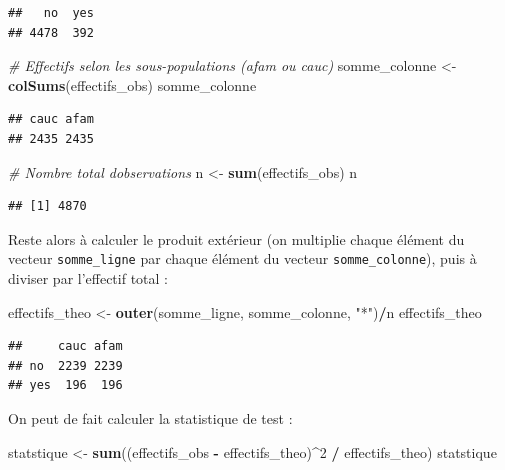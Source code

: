 \documentclass[
  11pt,
]{book}
\newenvironment{Shaded}{\begin{snugshade}}{\end{snugshade}}
\newcommand{\CommentTok}[1]{\textcolor[rgb]{0.56,0.35,0.01}{\textit{#1}}}
\newcommand{\DecValTok}[1]{\textcolor[rgb]{0.00,0.00,0.81}{#1}}
\newcommand{\FunctionTok}[1]{\textcolor[rgb]{0.13,0.29,0.53}{\textbf{#1}}}
\newcommand{\NormalTok}[1]{#1}
\newcommand{\OtherTok}[1]{\textcolor[rgb]{0.56,0.35,0.01}{#1}}
\newcommand{\SpecialCharTok}[1]{\textcolor[rgb]{0.81,0.36,0.00}{\textbf{#1}}}
\newcommand{\StringTok}[1]{\textcolor[rgb]{0.31,0.60,0.02}{#1}}
\numberwithin{equation}{section}
\numberwithin{countremarque}{section}
\begin{document}
\begin{lstlisting}
##   no  yes 
## 4478  392
\end{lstlisting}

\begin{Shaded}
\begin{Highlighting}[]
\CommentTok{\# Effectifs selon les sous{-}populations (afam ou cauc)}
\NormalTok{somme\_colonne }\OtherTok{\textless{}{-}} \FunctionTok{colSums}\NormalTok{(effectifs\_obs)}
\NormalTok{somme\_colonne}
\end{Highlighting}
\end{Shaded}

\begin{lstlisting}
## cauc afam 
## 2435 2435
\end{lstlisting}

\begin{Shaded}
\begin{Highlighting}[]
\CommentTok{\# Nombre total d\textquotesingle{}observations}
\NormalTok{n }\OtherTok{\textless{}{-}} \FunctionTok{sum}\NormalTok{(effectifs\_obs)}
\NormalTok{n}
\end{Highlighting}
\end{Shaded}

\begin{lstlisting}
## [1] 4870
\end{lstlisting}

Reste alors à calculer le produit extérieur (on multiplie chaque élément du vecteur \texttt{somme\_ligne} par chaque élément du vecteur \texttt{somme\_colonne}), puis à diviser par l'effectif total :

\begin{Shaded}
\begin{Highlighting}[]
\NormalTok{effectifs\_theo }\OtherTok{\textless{}{-}} \FunctionTok{outer}\NormalTok{(somme\_ligne, somme\_colonne, }\StringTok{"*"}\NormalTok{)}\SpecialCharTok{/}\NormalTok{n}
\NormalTok{effectifs\_theo}
\end{Highlighting}
\end{Shaded}

\begin{lstlisting}
##     cauc afam
## no  2239 2239
## yes  196  196
\end{lstlisting}

On peut de fait calculer la statistique de test :

\begin{Shaded}
\begin{Highlighting}[]
\NormalTok{statstique }\OtherTok{\textless{}{-}} \FunctionTok{sum}\NormalTok{((effectifs\_obs }\SpecialCharTok{{-}}\NormalTok{ effectifs\_theo)}\SpecialCharTok{\^{}}\DecValTok{2} \SpecialCharTok{/}\NormalTok{ effectifs\_theo)}
\NormalTok{statstique}
\end{Highlighting}
\end{Shaded}
\end{document}
